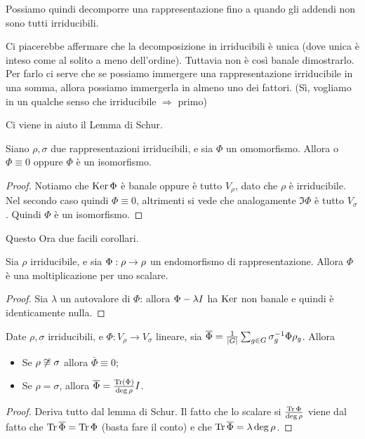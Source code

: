 	Possiamo quindi decomporre una rappresentazione fino a quando gli addendi non sono tutti irriducibili.

	Ci piacerebbe affermare che la decomposizione in irriducibili è unica (dove unica è inteso come al solito a meno dell'ordine). Tuttavia non è così banale dimostrarlo. Per farlo ci serve che se possiamo immergere una rappresentazione irriducibile in una somma, allora possiamo immergerla in almeno uno dei fattori. (Sì, vogliamo in un qualche senso che irriducibile $\Rightarrow$ primo)

	Ci viene in aiuto il Lemma di Schur.

	\begin{mytheorem}
		Siano $\rho,\sigma$ due rappresentazioni irriducibili, e sia $\Phi$ un omomorfismo. Allora o $\Phi \equiv 0$ oppure $\Phi$ è un isomorfismo.
	\end{mytheorem}
	\begin{proof}
		Notiamo che $\operatorname{Ker} \Phi$ è banale oppure è tutto $V_\rho$, dato che $\rho$ è irriducibile. Nel secondo caso quindi $\Phi\equiv 0$, altrimenti si vede che analogamente $\Im \Phi$ è tutto $V_\sigma$. Quindi $\Phi$ è un isomorfismo.
	\end{proof}

	Questo Ora due facili corollari.

	\begin{mycor}
		Sia $\rho$ irriducibile, e sia $\Phi: \rho \rightarrow \rho$ un endomorfismo di rappresentazione. Allora $\Phi$ è una moltiplicazione per uno scalare. 
	\end{mycor}
	\begin{proof}
		Sia $\lambda$ un autovalore di $\Phi$: allora $\Phi-\lambda I$ ha $\operatorname{Ker}$ non banale e quindi è identicamente nulla.
	\end{proof}

	\begin{mycor}
		Date $\rho,\sigma$ irriducibili, e $\Phi: V_\rho \rightarrow V_\sigma$ lineare, sia $\overline \Phi = \frac 1{\left|G\right|} \sum_{g\in G} \sigma_g^{-1} \Phi \rho_g$. Allora
		\begin{itemize}
		\item Se $\rho \not \cong \sigma$ allora $\bar \Phi\equiv 0$;
		\item Se $\rho = \sigma$, allora $\overline \Phi = \frac{\operatorname{Tr}(\Phi)}{\deg \rho}I$.
		\end{itemize}
	\end{mycor}
	\begin{proof}
		Deriva tutto dal lemma di Schur. Il fatto che lo scalare si $\frac{\operatorname{Tr} \Phi}{\deg \rho}$ viene dal fatto che $\operatorname{Tr} \overline \Phi = \operatorname{Tr} \Phi$ (basta fare il conto) e che $\operatorname{Tr} \overline \Phi = \lambda \deg \rho$.
	\end{proof}


